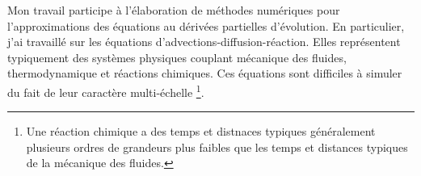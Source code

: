 Mon travail participe à l'élaboration de méthodes numériques pour l'approximations des équations au dérivées partielles d'évolution.
En particulier, j'ai travaillé sur les équations d'advections-diffusion-réaction. Elles représentent typiquement des systèmes physiques couplant
mécanique des fluides, thermodynamique et réactions chimiques.
Ces équations sont difficiles à simuler du fait de leur caractère multi-échelle
\footnote{Une réaction chimique a des temps et distnaces typiques généralement plusieurs ordres de grandeurs plus faibles que les temps et distances typiques de la mécanique des fluides.}.
